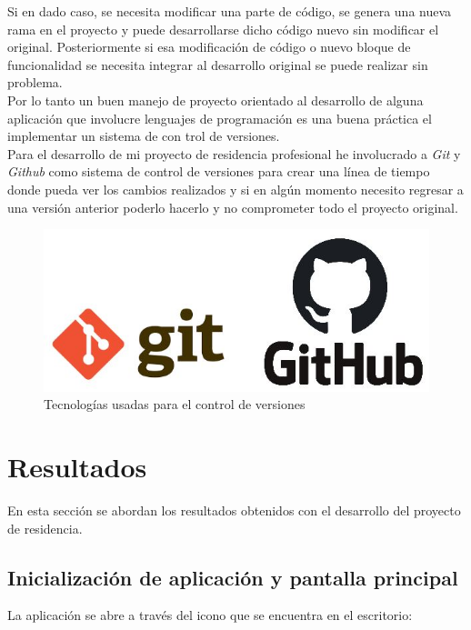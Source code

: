 \documentclass[12pt,titlepage]{article}
\begin{document}
Si en dado caso, se necesita modificar una parte de código, se genera una nueva rama en el proyecto y puede desarrollarse dicho código nuevo sin modificar el original. Posteriormente si esa modificación de código o nuevo bloque de funcionalidad se necesita integrar al desarrollo original se puede realizar sin problema. \\

Por lo tanto un buen manejo de proyecto orientado al desarrollo de alguna aplicación que involucre lenguajes de programación es una buena práctica el implementar un sistema de con trol de versiones. \\

Para el desarrollo de mi proyecto de residencia profesional he involucrado a \textit{Git} y \textit{Github} como sistema de control de versiones para crear una línea de tiempo donde pueda ver los cambios realizados y si en algún momento necesito regresar a una versión anterior poderlo hacerlo y no comprometer todo el proyecto original. \\ 

\begin{figure}[htbp]
\hspace*{1.0cm} 
\includegraphics[scale=0.95]{logo_git}
\caption{Tecnologías usadas para el control de versiones}
\end{figure}


\newpage
\section{Resultados}
En esta sección se abordan los resultados obtenidos con el desarrollo del proyecto de residencia. \\

\subsection{Inicialización de aplicación y pantalla principal}
La aplicación se abre a través del icono que se encuentra en el escritorio: \\ 
\end{document}
